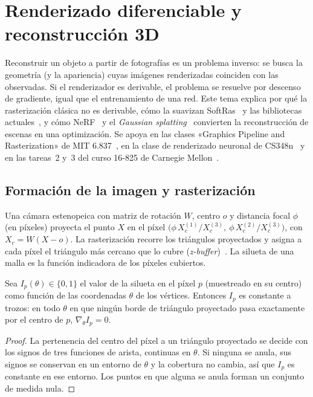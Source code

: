 \chapter{Renderizado diferenciable y reconstrucción 3D}
\label{tema:4}

Reconstruir un objeto a partir de fotografías es un problema inverso: se busca la geometría (y la apariencia) cuyas imágenes renderizadas coinciden con las observadas. Si el renderizador es derivable, el problema se resuelve por descenso de gradiente, igual que el entrenamiento de una red. Este tema explica por qué la rasterización clásica no es derivable, cómo la suavizan SoftRas~\cite{softras} y las bibliotecas actuales~\cite{pytorch3d,nvdiffrast,mitsuba3}, y cómo NeRF~\cite{nerf} y el \emph{Gaussian splatting}~\cite{gs} convierten la reconstrucción de escenas en una optimización. Se apoya en las clases «Graphics Pipeline and Rasterization» de MIT 6.837~\cite{mit6837}, en la clase de renderizado neuronal de CS348n~\cite{cs348n} y en las tareas~2 y~3 del curso 16-825 de Carnegie Mellon~\cite{cmu16825}.

\section{Formación de la imagen y rasterización}

Una cámara estenopeica con matriz de rotación $W$, centro $o$ y distancia focal $\phi$ (en píxeles) proyecta el punto $X$ en el píxel $\bigl(\phi\,X_c^{(1)}/X_c^{(3)},\ \phi\,X_c^{(2)}/X_c^{(3)}\bigr)$, con $X_c=W(X-o)$. La rasterización recorre los triángulos proyectados y asigna a cada píxel el triángulo más cercano que lo cubre (\emph{z-buffer})~\cite{mit6837}. La silueta de una malla es la función indicadora de los píxeles cubiertos.

\begin{proposicion}\label{prop:grad-cero}
Sea $I_p(\theta)\in\{0,1\}$ el valor de la silueta en el píxel $p$ (muestreado en su centro) como función de las coordenadas $\theta$ de los vértices. Entonces $I_p$ es constante a trozos: en todo $\theta$ en que ningún borde de triángulo proyectado pasa exactamente por el centro de $p$, $\nabla_\theta I_p=0$.
\end{proposicion}

\begin{proof}
La pertenencia del centro del píxel a un triángulo proyectado se decide con los signos de tres funciones de arista, continuas en $\theta$. Si ninguna se anula, sus signos se conservan en un entorno de $\theta$ y la cobertura no cambia, así que $I_p$ es constante en ese entorno. Los puntos en que alguna se anula forman un conjunto de medida nula.
\end{proof}

